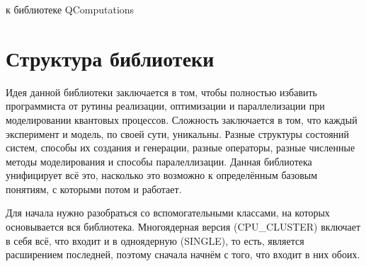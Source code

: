 \documentclass[12pt,fleqn]{article}
\begin{document}
    \begin{titlepage}
        \begin{center}
            \textsf{\Large{} к библиотеке QComputations}\\[15mm]
        \end{center}
    \end{titlepage}

    \newpage

    \setcounter{page}{2}
	\thispagestyle{empty}
	\tableofcontents

    \newpage

    \section{Структура библиотеки}
        Идея данной библиотеки заключается в том, чтобы полностью избавить программиста от рутины реализации, оптимизации и параллелизации 
        при моделировании квантовых процессов. Сложность заключается в том, что каждый эксперимент и модель, по своей сути, уникальны. 
        Разные структуры состояний систем, способы их создания и генерации, разные операторы, разные численные методы моделирования и способы паралеллизации. Данная библиотека унифицирует всё это, 
        насколько это возможно к определённым базовым понятиям, с которыми потом и работает.

        Для начала нужно разобраться со вспомогательными классами, на которых основывается вся библиотека. Многоядерная версия (CPU\_CLUSTER) включает в 
        себя всё, что входит и в одноядерную (SINGLE), то есть, является расширением последней, поэтому сначала начнём с того, что входит в них обоих.
\end{document}
